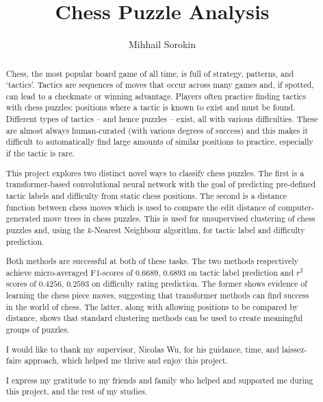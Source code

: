 \documentclass[a4paper, twoside]{report}
\title{Chess Puzzle Analysis}
\author{Mihhail Sorokin}
\begin{document}



\begin{abstract}

  Chess, the most popular board game of all time, is full of strategy,
  patterns, and `tactics'. Tactics are sequences of moves that occur across
  many games and, if spotted, can lead to a checkmate or winning advantage.
  Players often practice finding tactics with chess puzzles: positions where a
  tactic is known to exist and must be found. Different types of tactics -- and
  hence puzzles -- exist, all with various difficulties. These are almost
  always human-curated (with various degrees of success) and this makes it
  difficult to automatically find large amounts of similar positions to
  practice, especially if the tactic is rare.

  This project explores two distinct novel ways to classify chess puzzles. The
  first is a transformer-based convolutional neural network with the goal of
  predicting pre-defined tactic labels and difficulty from static chess
  positions. The second is a distance function between chess moves which is
  used to compare the edit distance of computer-generated move trees in chess
  puzzles. This is used for unsupervised clustering of chess puzzles and, using
  the $k$-Nearest Neighbour algorithm, for tactic label and difficulty
  prediction.

  Both methods are successful at both of these tasks. The two methods
  respectively achieve micro-averaged F1-scores of $0.6689$, $0.6893$ on tactic
  label prediction and $r^2$ scores of $0.4256$, $0.2593$ on difficulty rating
  prediction. The former shows evidence of learning the chess piece moves,
  suggesting that transformer methods can find success in the world of chess.
  The latter, along with allowing positions to be compared by distance, shows
  that standard clustering methods can be used to create meaningful groups of
  puzzles.

\end{abstract}

\renewcommand{\abstractname}{Acknowledgements}
\begin{abstract}

  I would like to thank my supervisor, Nicolas Wu, for his guidance, time, and
  laissez-faire approach, which helped me thrive and enjoy this project.

  I express my gratitude to my friends and family who helped and supported
  me during this project, and the rest of my studies. 

\end{abstract}
\end{document}
